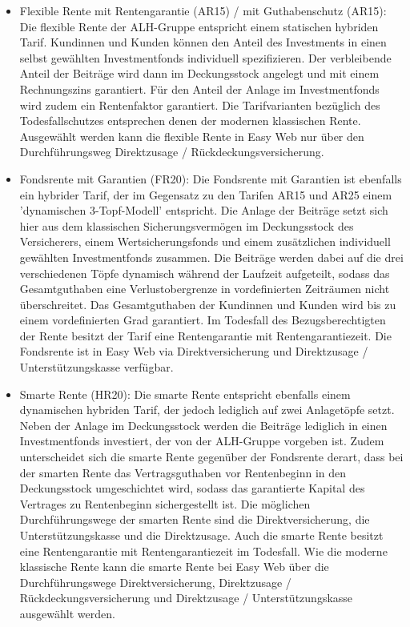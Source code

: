 \begin{itemize}
\item Flexible Rente mit Rentengarantie (AR15) / mit Guthabenschutz (AR15): Die flexible Rente der ALH-Gruppe entspricht einem statischen hybriden Tarif. Kundinnen und Kunden können den Anteil des Investments in einen selbst gewählten Investmentfonds individuell spezifizieren. Der verbleibende Anteil der Beiträge wird dann im Deckungsstock angelegt und mit einem Rechnungszins garantiert. Für den Anteil der Anlage im Investmentfonds wird zudem ein Rentenfaktor garantiert. Die Tarifvarianten bezüglich des Todesfallschutzes entsprechen denen der modernen klassischen Rente. Ausgewählt werden kann die flexible Rente in Easy Web nur über den Durchführungsweg Direktzusage / Rückdeckungsversicherung.
\item Fondsrente mit Garantien (FR20): Die Fondsrente mit Garantien ist ebenfalls ein hybrider Tarif, der im Gegensatz zu den Tarifen AR15 und AR25 einem 'dynamischen 3-Topf-Modell' entspricht. Die Anlage der Beiträge setzt sich hier aus dem klassischen Sicherungsvermögen im Deckungsstock des Versicherers, einem Wertsicherungsfonds und einem zusätzlichen individuell gewählten Investmentfonds zusammen. Die Beiträge werden dabei auf die drei verschiedenen Töpfe dynamisch während der Laufzeit aufgeteilt, sodass das Gesamtguthaben eine Verlustobergrenze in vordefinierten Zeiträumen nicht überschreitet. Das Gesamtguthaben der Kundinnen und Kunden wird bis zu einem vordefinierten Grad garantiert. Im Todesfall des Bezugsberechtigten der Rente besitzt der Tarif eine Rentengarantie mit Rentengarantiezeit. Die Fondsrente ist in Easy Web via Direktversicherung und Direktzusage / Unterstützungskasse verfügbar.
\item Smarte Rente (HR20): Die smarte Rente entspricht ebenfalls einem dynamischen hybriden Tarif, der jedoch lediglich auf zwei Anlagetöpfe setzt. Neben der Anlage im Deckungsstock werden die Beiträge lediglich in einen Investmentfonds investiert, der von der ALH-Gruppe vorgeben ist. Zudem unterscheidet sich die smarte Rente gegenüber der Fondsrente derart, dass bei der smarten Rente das Vertragsguthaben vor Rentenbeginn in den Deckungsstock umgeschichtet wird, sodass das garantierte Kapital des Vertrages zu Rentenbeginn sichergestellt ist. Die möglichen Durchführungswege der smarten Rente sind die Direktversicherung, die Unterstützungskasse und die Direktzusage. Auch die smarte Rente besitzt eine Rentengarantie mit Rentengarantiezeit im Todesfall. Wie die moderne klassische Rente kann die smarte Rente bei Easy Web über die Durchführungswege Direktversicherung, Direktzusage / Rückdeckungsversicherung und Direktzusage / Unterstützungskasse ausgewählt werden.
\end{itemize}

